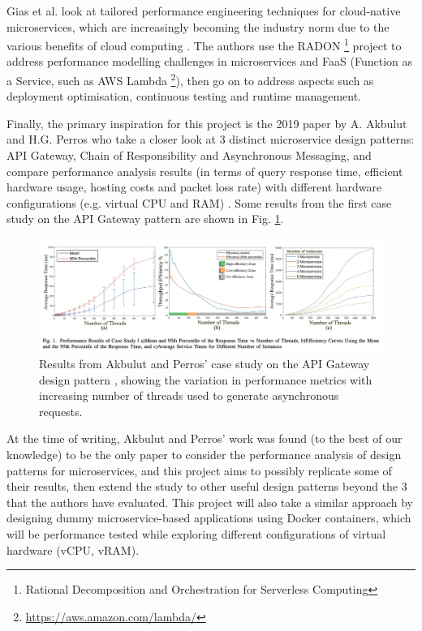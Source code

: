 Gias et al. look at tailored performance engineering techniques for cloud-native microservices, which are increasingly becoming the industry norm due to the various benefits of cloud computing \cite{gias20}. The authors use the RADON \footnote{Rational Decomposition and Orchestration for Serverless Computing} project to address performance modelling challenges in microservices and FaaS (Function as a Service, such as AWS Lambda \footnote{\url{https://aws.amazon.com/lambda/}}), then go on to address aspects such as deployment optimisation, continuous testing and runtime management.

Finally, the primary inspiration for this project is the 2019 paper by A. Akbulut and H.G. Perros who take a closer look at 3 distinct microservice design patterns: API Gateway, Chain of Responsibility and Asynchronous Messaging, and compare performance analysis results (in terms of query response time, efficient hardware usage, hosting costs and packet loss rate) with different hardware configurations (e.g. virtual CPU and RAM) \cite{akbulut19}. Some results from the first case study on the API Gateway pattern are shown in Fig. \ref{fig:akbulut19-results}. 

\begin{figure}[h]
	\centering
	\includegraphics[width=1.0\linewidth]{./assets/images/related-work/akbulut19-results}
	\caption{Results from Akbulut and Perros' case study on the API Gateway design pattern \cite{akbulut19}, showing the variation in performance metrics with increasing number of threads used to generate asynchronous requests.}
	\label{fig:akbulut19-results}
\end{figure}

At the time of writing, Akbulut and Perros' work was found (to the best of our knowledge) to be the only paper to consider the performance analysis of design patterns for microservices, and this project aims to possibly replicate some of their results, then extend the study to other useful design patterns beyond the 3 that the authors have evaluated. This project will also take a similar approach by designing dummy microservice-based applications using Docker containers, which will be performance tested while exploring different configurations of virtual hardware (vCPU, vRAM).

